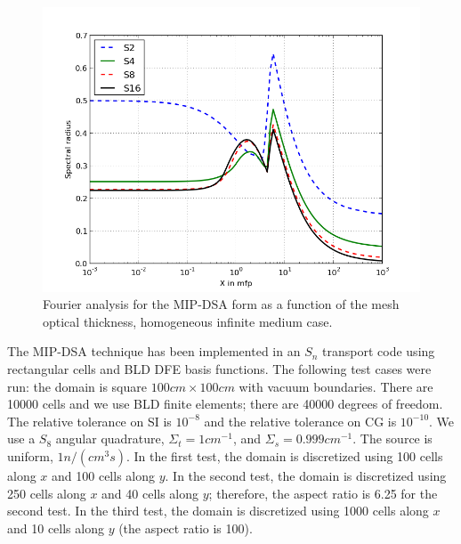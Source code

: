 \documentclass{mc2013}
\renewcommand{\(}{\left(}
\renewcommand{\)}{\right)}
\renewcommand{\[}{\left[}
\renewcommand{\]}{\right]}
\newcommand{\sn}{\ensuremath{S_n}\xspace}
\begin{document}
\begin{figure}[!hbtp]
\begin{center}
\includegraphics[scale=0.6]{optical_thickness_bld}
\end{center}
\caption{Fourier analysis for the MIP-DSA form as a function of the mesh optical thickness, homogeneous infinite medium case.}
\label{fig:FA}
\end{figure}

 \label{sec:2d-results}

The MIP-DSA technique has been implemented in  an \sn transport code using rectangular cells and BLD DFE basis functions. 
The following test cases were run: the domain is square $100cm \times 100cm$ with vacuum 
boundaries. There are 10000 cells and we use BLD finite elements; 
there are 40000 degrees of freedom. The relative tolerance on SI is $10^{-8}$ 
and the relative tolerance on CG is $10^{-10}$. We use a $S_{8}$ angular quadrature, 
$\Sigma_t = 1 cm^{-1}$, and $\Sigma_s = 0.999 cm^{-1}$. The source is uniform,
$1n/(cm^3s)$. In the first test, the domain is discretized using 100 cells along
$x$ and 100 cells along $y$. In the second test, the domain is discretized using
250 cells along $x$ and 40 cells along $y$; therefore, the aspect ratio is 6.25
for the second test. In the third test, the domain is discretized using 1000
cells along $x$ and 10 cells along $y$ (the aspect ratio is 100).
\end{document}
